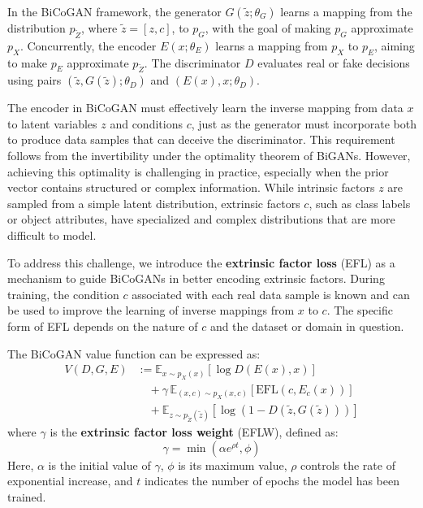 In the BiCoGAN framework, the generator
\( G(\tilde{z}; \theta_G) \) learns a mapping from the distribution
\( p_{\tilde{Z}} \), where \( \tilde{z} = [z, c] \), to \( p_G \),
with the goal of making \( p_G \) approximate \( p_X \). Concurrently,
the encoder \( E(x; \theta_E) \) learns a mapping from \( p_X \) to \( p_E \),
aiming to make \( p_E \) approximate \( p_{\tilde{Z}} \). The discriminator
\( D \) evaluates real or fake decisions using pairs
\( (\tilde{z}, G(\tilde{z}); \theta_D) \) and \( (E(x), x; \theta_D) \).

The encoder in BiCoGAN must effectively learn the inverse mapping from data
\( x \) to latent variables \( z \) and conditions \( c \),
just as the generator must incorporate both to produce data samples
that can deceive the discriminator. This requirement follows from the
invertibility under the optimality theorem of BiGANs.
However, achieving this optimality is challenging in practice,
especially when the prior vector contains structured or complex information.
While intrinsic factors \( z \) are sampled from a simple latent distribution,
extrinsic factors \( c \), such as class labels or object attributes,
have specialized and complex distributions that are more difficult to model.

To address this challenge, we introduce the
\textbf{extrinsic factor loss} (EFL) as a mechanism to guide BiCoGANs
in better encoding extrinsic factors. During training, the condition
\( c \) associated with each real data sample is known and can be used to
improve the learning of inverse mappings from \( x \) to \( c \).
The specific form of EFL depends on the nature of \( c \) and the dataset
or domain in question.

The BiCoGAN value function can be expressed as:
\begin{equation}
\begin{aligned}
V(D, G, E) &:= \mathbb{E}_{x \sim p_X(x)} [\log D(E(x), x)]\\
&\quad + \gamma \, \mathbb{E}_{(x, c) \sim p_X(x, c)} [\text{EFL}(c, E_c(x))] \\
&\quad +\mathbb{E}_{z \sim p_{\tilde{Z}} (\tilde{z})} [\log (1 - D(\tilde{z}, G(\tilde{z})))]
\end{aligned}
\end{equation}
where \( \gamma \) is the \textbf{extrinsic factor loss weight} (EFLW),
defined as:
\[
\gamma = \min(\alpha e^{\rho t}, \phi)
\]
Here, \( \alpha \) is the initial value of \( \gamma \), \( \phi \)
is its maximum value, \( \rho \) controls the rate of exponential increase,
and \( t \) indicates the number of epochs the model has been trained.

